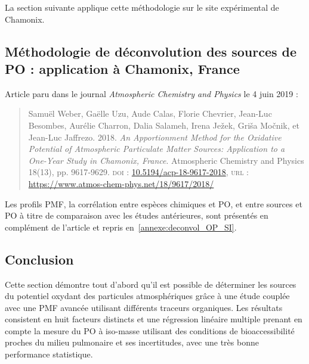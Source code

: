 La section suivante applique cette méthodologie sur le site expérimental de Chamonix.

\subsection{Méthodologie de déconvolution des sources de PO : application à Chamonix,
    France}
\label{sec:weber_et_al_2018}

\begin{tcolorbox}[colback=red!5!white,colframe=Melon,title=Note]
Article paru dans le journal \textit{Atmospheric Chemistry and Physics} le 4 juin 2019 :

\begin{quote}
    Samuël Weber, Gaëlle Uzu, Aude Calas, Florie Chevrier, Jean-Luc Besombes,
    Aurélie Charron, Dalia Salameh, Irena Ježek, Griša Močnik, et Jean-Luc Jaffrezo. 2018.
    \textit{An Apportionment Method for the Oxidative Potential of Atmospheric Particulate
    Matter Sources: Application to a One-Year Study in Chamonix, France}. Atmospheric
    Chemistry and Physics 18(13), pp. 9617‑9629.
    \textsc{doi} : \href{https://doi.org/10.5194/acp-18-9617-2018}{10.5194/acp-18-9617-2018},
    \textsc{url} : \url{https://www.atmos-chem-phys.net/18/9617/2018/}
\end{quote}

Les profils PMF, la corrélation entre espèces chimiques et PO, et entre sources et
PO à titre de comparaison avec les études antérieures, sont présentés en complément de
l'article et repris en~\ref{annexe:deconvol_OP_SI}.
\end{tcolorbox}

\clearpage


\subsection{Conclusion}

Cette section démontre tout d'abord qu'il est possible de déterminer les sources du
potentiel oxydant des particules atmosphériques grâce à une étude couplée avec une PMF
avancée utilisant différents traceurs organiques. Les résultats consistent en huit facteurs
distincts et une régression linéaire multiple prenant en compte
la mesure du PO à iso-masse utilisant des conditions de bioaccessibilité proches du milieu
pulmonaire et ses incertitudes, avec une très bonne performance statistique.

